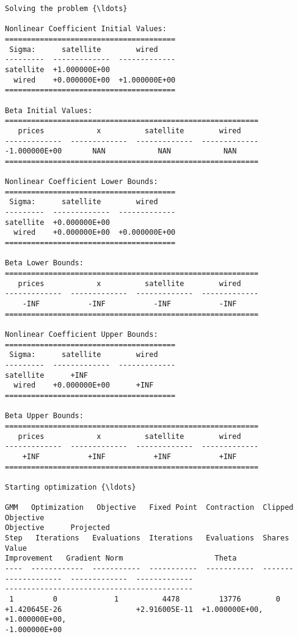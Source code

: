     \begin{Verbatim}[commandchars=\\\{\}]
Solving the problem {\ldots}

Nonlinear Coefficient Initial Values:
=======================================
 Sigma:      satellite        wired
---------  -------------  -------------
satellite  +1.000000E+00
  wired    +0.000000E+00  +1.000000E+00
=======================================

Beta Initial Values:
==========================================================
   prices            x          satellite        wired
-------------  -------------  -------------  -------------
-1.000000E+00       NAN            NAN            NAN
==========================================================

Nonlinear Coefficient Lower Bounds:
=======================================
 Sigma:      satellite        wired
---------  -------------  -------------
satellite  +0.000000E+00
  wired    +0.000000E+00  +0.000000E+00
=======================================

Beta Lower Bounds:
==========================================================
   prices            x          satellite        wired
-------------  -------------  -------------  -------------
    -INF           -INF           -INF           -INF
==========================================================

Nonlinear Coefficient Upper Bounds:
=======================================
 Sigma:      satellite        wired
---------  -------------  -------------
satellite      +INF
  wired    +0.000000E+00      +INF
=======================================

Beta Upper Bounds:
==========================================================
   prices            x          satellite        wired
-------------  -------------  -------------  -------------
    +INF           +INF           +INF           +INF
==========================================================

Starting optimization {\ldots}

GMM   Optimization   Objective   Fixed Point  Contraction  Clipped    Objective
Objective      Projected
Step   Iterations   Evaluations  Iterations   Evaluations  Shares       Value
Improvement   Gradient Norm                     Theta
----  ------------  -----------  -----------  -----------  -------
-------------  -------------  -------------
-------------------------------------------
 1         0             1          4478         13776        0
+1.420645E-26                 +2.916005E-11  +1.000000E+00, +1.000000E+00,
-1.000000E+00


\end{Verbatim}
